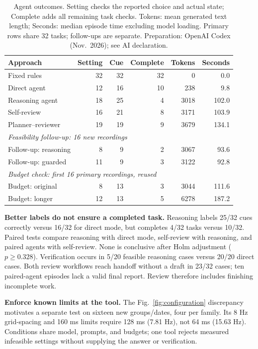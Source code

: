 \documentclass[runningheads,orivec]{llncs}
\begin{document}
\begin{table}[htbp]
\caption{Agent outcomes. Setting checks the reported choice and actual state; Complete adds all remaining task checks. Tokens: mean generated text length; Seconds: median episode time excluding model loading. Primary rows share 32 tasks; follow-ups are separate. Preparation: OpenAI Codex (Nov.\ 2026); see AI declaration.}
\label{tab:3}
\centering\small
\begin{tabular*}{\linewidth}{@{\extracolsep{\fill}}lrrrrr@{}}
\toprule
\textbf{Approach} & \textbf{Setting} & \textbf{Cue} & \textbf{Complete} & \textbf{Tokens} & \textbf{Seconds} \\
\midrule
Fixed rules & 32 & 32 & 32 & 0 & 0.0 \\
Direct agent & 12 & 16 & 10 & 238 & 9.8 \\
Reasoning agent & 18 & 25 & 4 & 3018 & 102.0 \\
Self-review & 16 & 21 & 8 & 3171 & 103.9 \\
Planner--reviewer & 19 & 19 & 9 & 3679 & 134.1 \\
\midrule
\multicolumn{6}{l}{\emph{Feasibility follow-up: 16 new recordings}} \\
Follow-up: reasoning & 8 & 9 & 2 & 3067 & 93.6 \\
Follow-up: guarded & 11 & 9 & 3 & 3122 & 92.8 \\
\midrule
\multicolumn{6}{l}{\emph{Budget check: first 16 primary recordings, reused}} \\
Budget: original & 8 & 13 & 3 & 3044 & 111.6 \\
Budget: longer & 12 & 13 & 5 & 6278 & 187.2 \\
\bottomrule
\end{tabular*}
\end{table}

\textbf{Better labels do not ensure a completed task.} Reasoning labels 25/32 cues correctly versus 16/32 for direct mode, but completes 4/32 tasks versus 10/32. Paired tests compare reasoning with direct mode, self-review with reasoning, and paired agents with self-review. None is conclusive after Holm adjustment ($p\geq0.328$). Verification occurs in 5/20 feasible reasoning cases versus 20/20 direct cases. Both review workflows reach handoff without a draft in 23/32 cases; ten paired-agent episodes lack a valid final report. Review therefore includes finishing incomplete work.

\textbf{Enforce known limits at the tool.} The Fig.~\ref{fig:configuration} discrepancy motivates a separate test on sixteen new groups/dates, four per family. Its 8 Hz grid-spacing and 160 ms limits require 128 ms (7.81 Hz), not 64 ms (15.63 Hz). Conditions share model, prompts, and budgets; one tool rejects measured infeasible settings without supplying the answer or verification.
\end{document}
